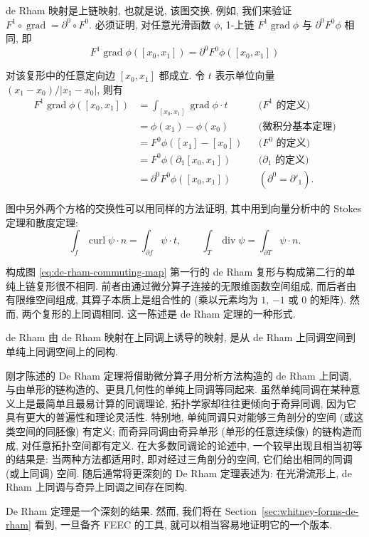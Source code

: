 de Rham 映射是上链映射, 也就是说, 该图交换. 例如, 我们来验证 $F^1\circ\operatorname{grad}=\partial^0\circ F^0$. 必须证明, 对任意光滑函数 $\phi$, 1-上链 $F^1\operatorname{grad}\phi$ 与 $\partial^0F^0\phi$ 相同, 即
\[
F^1\operatorname{grad}\phi([x_0,x_1])=\partial^0F^0\phi([x_0,x_1])
\]

对该复形中的任意定向边 $[x_0,x_1]$ 都成立. 令 $t$ 表示单位向量 $(x_1-x_0)/|x_1-x_0|$, 则有
\[
\begin{aligned}
F^1\operatorname{grad}\phi([x_0,x_1])
&=\int_{[x_0,x_1]}\operatorname{grad}\phi\cdot t
&&\text{{($F^1$ 的定义)}}\\
&=\phi(x_1)-\phi(x_0)
&&\text{{(微积分基本定理)}}\\
&=F^0\phi([x_1]-[x_0])
&&\text{{($F^0$ 的定义)}}\\
&=F^0\phi(\partial_1[x_0,x_1])
&&\text{{($\partial_1$ 的定义)}}\\
&=\partial^0F^0\phi([x_0,x_1])
&&(\partial^0=\partial'_1).
\end{aligned}
\]

图中另外两个方格的交换性可以用同样的方法证明, 其中用到向量分析中的 Stokes 定理和散度定理:
\[
\int_f\operatorname{curl}\psi\cdot n=\int_{\partial f}\psi\cdot t,\qquad
\int_T\operatorname{div}\psi=\int_{\partial T}\psi\cdot n.
\]

构成图 \eqref{eq:de-rham-commuting-map} 第一行的 de Rham 复形与构成第二行的单纯上链复形很不相同. 前者由通过微分算子连接的无限维函数空间组成, 而后者由有限维空间组成, 其算子本质上是组合性的 (乘以元素均为 $1$, $-1$ 或 $0$ 的矩阵). 然而, 两个复形的上同调相同. 这一陈述是 de Rham 定理的一种形式.

\begin{Theorem}{de Rham}\label{thm:de-rham-isomorphism}
由 de Rham 映射在上同调上诱导的映射, 是从 de Rham 上同调空间到单纯上同调空间上的同构.
\end{Theorem}

\begin{Remark}\label{rem:singular-simplicial-de-rham}
刚才陈述的 De Rham 定理将借助微分算子用分析方法构造的 de Rham 上同调, 与由单形的链构造的、更具几何性的单纯上同调等同起来. 虽然单纯同调在某种意义上是最简单且最易计算的同调理论, 拓扑学家却往往更倾向于奇异同调, 因为它具有更大的普遍性和理论灵活性. 特别地, 单纯同调只对能够三角剖分的空间 (或这类空间的同胚像) 有定义; 而奇异同调由奇异单形 (单形的任意连续像) 的链构造而成, 对任意拓扑空间都有定义. 在大多数同调论的论述中, 一个较早出现且相当初等的结果是: 当两种方法都适用时, 即对经过三角剖分的空间, 它们给出相同的同调 (或上同调) 空间. 随后通常将更深刻的 De Rham 定理表述为: 在光滑流形上, de Rham 上同调与奇异上同调之间存在同构.
\end{Remark}

De Rham 定理是一个深刻的结果. 然而, 我们将在 Section~\ref{sec:whitney-forms-de-rham} 看到, 一旦备齐 FEEC 的工具, 就可以相当容易地证明它的一个版本.
